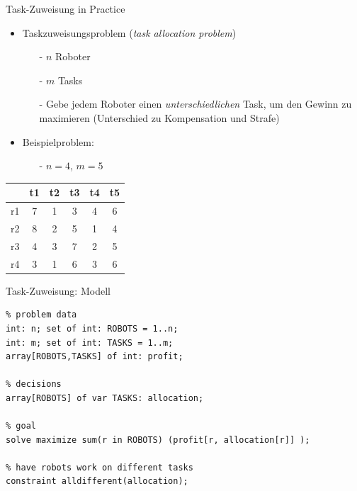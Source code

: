 \documentclass[10pt,xcolor={dvipsnames},fleqn]{beamer}
\begin{document}
\begin{frame}{Task-Zuweisung in Practice}
\begin{itemize}
\item Taskzuweisungsproblem (\emph{task allocation problem})

\begin{itemize}
\item [-] $n$ Roboter
\item [-] $m$ Tasks
\item [-] Gebe jedem Roboter einen \emph{unterschiedlichen} Task, um den Gewinn zu maximieren (Unterschied zu Kompensation und Strafe)
\end{itemize}
\item Beispielproblem:
\begin{itemize}
\item[-] $n = 4$, $m = 5$
\end{itemize}
\end{itemize}
\centering
\begin{tabular}{|c|c|c|c|c|c|}
\hline 
 & t1 & t2 & t3 & t4 & t5 \\ 
\hline 
r1 & 7 & 1 & 3 & 4 & 6 \\ 
\hline 
r2 & 8 & 2 & 5 & 1 & 4 \\ 
\hline 
r3 & 4 & 3 & 7 & 2 & 5 \\ 
\hline 
r4 & 3 & 1 & 6 & 3 & 6 \\ 
\hline 
\end{tabular} 
\end{frame}


\begin{frame}[fragile]{Task-Zuweisung: Modell}
\begin{lstlisting}
% problem data 
int: n; set of int: ROBOTS = 1..n;
int: m; set of int: TASKS = 1..m;
array[ROBOTS,TASKS] of int: profit;

% decisions
array[ROBOTS] of var TASKS: allocation;

% goal
solve maximize sum(r in ROBOTS) (profit[r, allocation[r]] );

% have robots work on different tasks
constraint alldifferent(allocation);
\end{lstlisting}
\end{frame}
\end{document}
